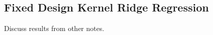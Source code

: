 \documentclass[12pt]{article}
\begin{document}
\subsection{Fixed Design Kernel Ridge Regression}
Discuss results from other notes.

\end{document}
